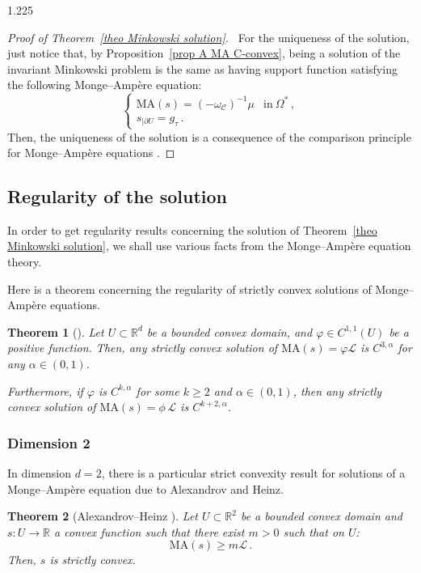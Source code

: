 \documentclass[reqno, a4paper]{amsart}
\numberwithin{equation}{section}
\numberwithin{figure}{section}
\newtheorem{theorem}{Theorem}[section]
\theoremstyle{definition}
\theoremstyle{remark}
\newcommand{\R}{\mathbb{R}} %
\newcommand{\C}{\mathcal{C}} %
\newcommand{\MA}{\mathrm{MA}} %
\begin{document}
\begin{spacing}{1.225}
\begin{proof}[Proof of Theorem~\ref{theo Minkowski solution}]
\noindent \textbullet\ For the uniqueness of the solution, just notice that, by Proposition~\ref{prop A MA C-convex}, being a solution of the invariant Minkowski problem is the same as having support function satisfying the following Monge--Amp\`ere equation:
\begin{equation*}
\begin{cases}
\MA(s) = (-\omega_\C)^{-1}\mu & \text{in} \ \Omega^* \, ,\\
s_{\vert \partial U} = g_\tau \, .
\end{cases}
\end{equation*}
Then, the uniqueness of the solution is a consequence of the comparison principle for Monge--Amp\`ere equations \cite[Theorem~2.10 and Corollary~2.11]{Figalli_17}. 
\end{proof}



\subsection{Regularity of the solution}

In order to get regularity results concerning the solution of Theorem~\ref{theo Minkowski solution}, we shall use various facts from the Monge--Amp\`ere equation theory. 

Here is a theorem concerning the regularity of strictly convex solutions of Monge--Amp\`ere equations. 

\begin{theorem}[{\cite[Theorem~3.1]{Trudinger_Wang_08}}]
\label{Strictly convex solution is C2}
Let $U \subset \R^d$ be a bounded convex domain, and $\varphi \in C^{1,1}(U)$ be a positive function. Then, any strictly convex solution of $\MA(s) = \varphi \mathcal{L}$ is $ C^{3,\alpha}$ for any $\alpha \in (0,1)$. 

Furthermore, if $\varphi$ is $C^{k,\alpha}$ for some $k\geq2$ and $\alpha \in (0,1)$, then any strictly convex solution of $\MA(s) = \phi \, \mathcal{L}$ is $ C^{k+2,\alpha}$. 
\end{theorem}

\subsubsection{Dimension 2}

In dimension $d=2$, there is a particular strict convexity result for solutions of a Monge--Amp\`ere equation due to Alexandrov and Heinz. 

\begin{theorem}[Alexandrov--Heinz {\cite[Remark 3.2]{Trudinger_Wang_08}}]
\label{Solution is strictly convex}
Let $U \subset \R^2$ be a bounded convex domain and $s:U \to \R$ a convex function such that there exist $m>0$ such that on $U$:
\begin{equation*}
\MA(s) \geq m\mathcal{L} \, . 
\end{equation*} 
Then, $s$ is strictly convex. 
\end{theorem}


\end{spacing}
\end{document}
